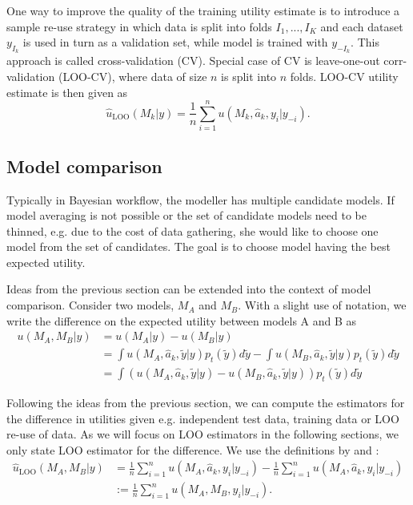 \documentclass{article}
\begin{document}
One way to improve the quality of the training utility estimate is to introduce a sample re-use strategy in which data is split into folds $I_1, ..., I_K$ and each dataset $y_{I_k}$ is used in turn as a validation set, while model is trained with $y_{-I_k}$. This approach is called cross-validation (CV). Special case of CV is leave-one-out corr-validation (LOO-CV), where data of size $n$ is split into $n$ folds. LOO-CV utility estimate is then given as 
\begin{equation}
    \hat{u}_{\text{LOO}}(M_k | y) = \frac{1}{n} \sum_{i = 1}^n u(M_k, \hat{a}_k, y_i | y_{-i}) \label{eq:loo-utility}.
\end{equation}

\subsection{Model comparison}
Typically in Bayesian workflow, the modeller has multiple candidate models. If model averaging is not possible or the set of candidate models need to be thinned, e.g. due to the cost of data gathering, she would like to choose one model from the set of candidates. The goal is to choose model having the best expected utility.

Ideas from the previous section can be extended into the context of model comparison. Consider two models, $M_A$ and $M_B$. With a slight use of notation, we write the difference on the expected utility between models A and B as
\begin{align}
    u(M_A, M_B | y) &= u(M_A | y) - u(M_B | y) \nonumber \\ 
    &= \int u(M_A, \hat{a}_k, \tilde{y} | y) p_t(\tilde{y}) d\tilde{y} - \int u(M_B, \hat{a}_k, \tilde{y} | y) p_t(\tilde{y}) d\tilde{y} \nonumber \\
    &= \int \left( u(M_A, \hat{a}_k, \tilde{y} | y) - u(M_B, \hat{a}_k, \tilde{y} | y) \right) p_t(\tilde{y}) d\tilde{y} \label{eq:true-diff}
\end{align}

Following the ideas from the previous section, we can compute the estimators for the difference in utilities given e.g. independent test data, training data or LOO re-use of data. As we will focus on LOO estimators in the following sections, we only state LOO estimator for the difference. We use the definitions by \cite{vehtari_practical_2016} and \cite{sivula_uncertainty_2022}:
\begin{align}
    \hat{u}_{\text{LOO}}(M_A, M_B | y) &= \frac{1}{n} \sum_{i=1}^n u(M_A, \hat{a}_k, y_i | y_{-i}) - \frac{1}{n} \sum_{i=1}^n u(M_A, \hat{a}_k, y_i | y_{-i}) \nonumber \\
    &:= \frac{1}{n}\sum_{i=1}^n u(M_A, M_B, y_i | y_{-i}) \label{eq:loo-diff}.
\end{align}
\end{document}
